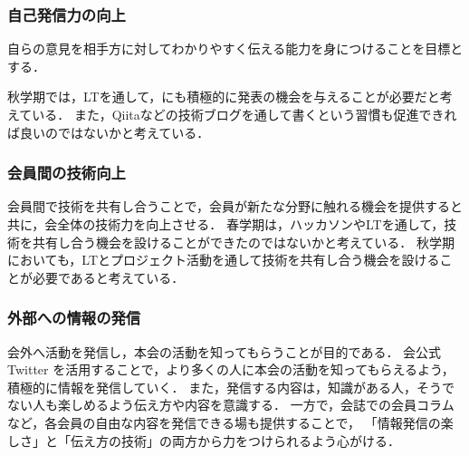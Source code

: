 \subsubsection*{自己発信力の向上}
自らの意見を相手方に対してわかりやすく伝える能力を身につけることを目標とする．

秋学期では，LTを通して，\firstGrade{}にも積極的に発表の機会を与えることが必要だと考えている．
また，Qiitaなどの技術ブログを通して書くという習慣も促進できれば良いのではないかと考えている．

\subsubsection*{会員間の技術向上}
会員間で技術を共有し合うことで，会員が新たな分野に触れる機会を提供すると共に，会全体の技術力を向上させる．
春学期は，ハッカソンやLTを通して，技術を共有し合う機会を設けることができたのではないかと考えている．
秋学期においても，LTとプロジェクト活動を通して技術を共有し合う機会を設けることが必要であると考えている．

\subsubsection*{外部への情報の発信}
会外へ活動を発信し，本会の活動を知ってもらうことが目的である．
会公式 Twitter を活用することで，より多くの人に本会の活動を知ってもらえるよう，積極的に情報を発信していく．
また，発信する内容は，知識がある人，そうでない人も楽しめるよう伝え方や内容を意識する．
一方で，会誌での会員コラムなど，各会員の自由な内容を発信できる場も提供することで，
「情報発信の楽しさ」と「伝え方の技術」の両方から力をつけられるよう心がける．
